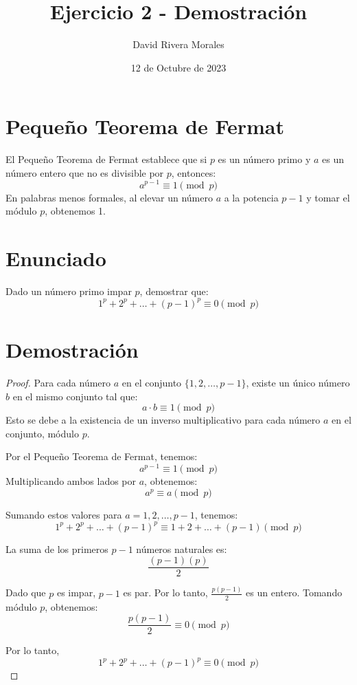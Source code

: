 \documentclass[12pt,a4paper]{article}
\begin{document}
\title{Ejercicio 2 - Demostración}
\author{David Rivera Morales}
\date{12 de Octubre de 2023}

\maketitle

\section{Pequeño Teorema de Fermat}
El Pequeño Teorema de Fermat establece que si \( p \) es un número primo y \( a \) es un número entero que no es divisible por \(p\), entonces:
\[a^{p-1} \equiv 1 \pmod{p}\]
En palabras menos formales, al elevar un número \( a \) a la potencia \( p-1 \) y tomar el módulo \( p \), obtenemos 1.

\section{Enunciado}
Dado un número primo impar \(p\), demostrar que:
\[1^p + 2^p + \dots + (p-1)^p \equiv 0 \pmod{p}\]

\section{Demostración}
\begin{proof}
Para cada número \(a\) en el conjunto \(\{1, 2, \dots, p-1\}\), existe un único número \(b\) en el mismo conjunto tal que:
\[a \cdot b \equiv 1 \pmod{p}\]
Esto se debe a la existencia de un inverso multiplicativo para cada número \(a\) en el conjunto, módulo \(p\).

Por el Pequeño Teorema de Fermat, tenemos:
\[a^{p-1} \equiv 1 \pmod{p}\]
Multiplicando ambos lados por \(a\), obtenemos:
\[a^p \equiv a \pmod{p}\]

Sumando estos valores para \(a = 1, 2, \dots, p-1\), tenemos:
\[1^p + 2^p + \dots + (p-1)^p \equiv 1 + 2 + \dots + (p-1) \pmod{p}\]

La suma de los primeros \(p-1\) números naturales es:
\[\frac{(p-1)(p)}{2}\]

Dado que \(p\) es impar, \(p-1\) es par. Por lo tanto, \(\frac{p(p-1)}{2}\) es un entero. Tomando módulo \(p\), obtenemos:
\[\frac{p(p-1)}{2} \equiv 0 \pmod{p}\]

Por lo tanto, 
\[1^p + 2^p + \dots + (p-1)^p \equiv 0 \pmod{p}\]
\end{proof}
\end{document}
